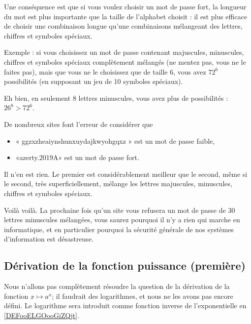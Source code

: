 \begin{normaltext}
    Une conséquence est que si vous voulez choisir un mot de passe fort, la longueur du mot est plus importante que la taille de l'alphabet choisit : il est plus efficace de choisir une combinaison longue qu'une combinaisons mélangeant des lettres, chiffres et symboles spéciaux.
    
    Exemple : si vous choisissez un mot de passe contenant majuscules, minuscules, chiffres et symboles spéciaux complètement mélangés (ne mentez pas, vous ne le faites pas), mais que vous ne le choisissez que de taille \( 6\), vous avez \( 72^6\) possibilités (en supposant un jeu de 10 symboles spéciaux).

    Eh bien, en seulement \( 8\) lettres minuscules, vous avez plus de possibilités : \( 26^8>72^6\).

    De nombreux sites font l'erreur de considérer que
    \begin{itemize}
        \item « ggzxzheaiynshunxuydajkwyohgqxz » est un mot de passe faible,
        \item «azerty.2019A» est un mot de passe fort.
    \end{itemize}
    Il n'en est rien. Le premier est considérablement meilleur que le second, même si le second, très superficiellement, mélange les lettres majuscules, minuscules, chiffres et symboles spéciaux.

    Voilà voilà. La prochaine fois qu'un site vous refusera un mot de passe de 30 lettres minuscules mélangées, vous saurez pourquoi il n'y a rien qui marche en informatique, et en particulier pourquoi la sécurité générale de nos systèmes d'information est désastreuse.
\end{normaltext}


\subsection{Dérivation de la fonction puissance (première)}

Nous n'allons pas complètement résoudre la question de la dérivation de la fonction \( x\mapsto a^x\); il faudrait des logarithmes, et nous ne les avons pas encore défini. Le logarithme sera introduit comme fonction inverse de l'exponentielle en \ref{DEFooELGOooGiZQjt}.

